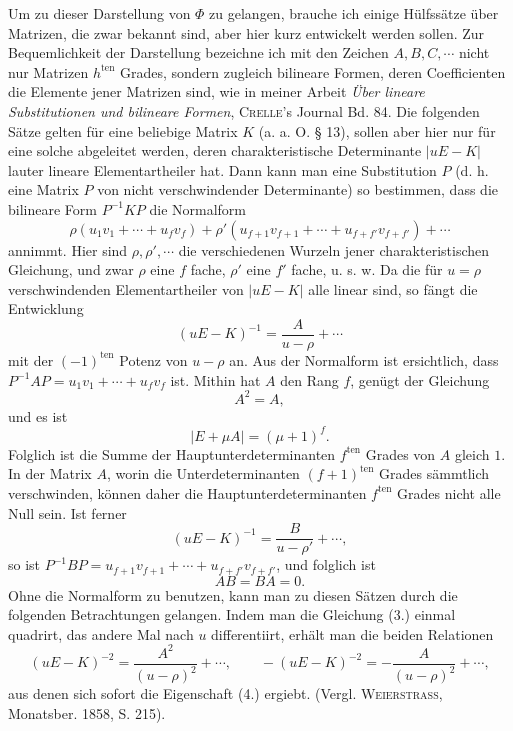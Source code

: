 \documentclass[11pt]{article}
\newcommand{\ten}{\mathrm{ten}}
\begin{document}
Um zu dieser Darstellung von $\Phi$ zu gelangen, brauche ich einige Hülfssätze über Matrizen, die zwar bekannt sind, aber hier kurz entwickelt werden sollen. Zur Bequemlichkeit der Darstellung bezeichne ich mit den Zeichen $A,B,C,\cdots$ nicht nur Matrizen $h^{\ten}$ Grades, sondern zugleich bilineare Formen, deren Coefficienten die Elemente jener Matrizen sind, wie in meiner Arbeit \emph{Über lineare Substitutionen und bilineare Formen}, \textsc{Crelle}'s Journal Bd. 84. Die folgenden Sätze gelten für eine beliebige Matrix $K$ (a. a. O. § 13), sollen aber hier nur für eine solche abgeleitet werden, deren charakteristische Determinante $|uE-K|$ lauter lineare Elementartheiler hat. Dann kann man eine Substitution $P$ (d. h. eine Matrix $P$ von nicht verschwindender Determinante) so bestimmen, dass die bilineare Form $P^{-1}KP$ die Normalform
\[
\rho(u_1v_1+\cdots+u_fv_f)+\rho'(u_{f+1}v_{f+1}+\cdots+u_{f+f'}v_{f+f'})+\cdots
\]
annimmt. Hier sind $\rho,\rho',\cdots$ die verschiedenen Wurzeln jener charakteristischen Gleichung, und zwar $\rho$ eine $f$ fache, $\rho'$ eine $f'$ fache, u. s. w. Da die für $u=\rho$ verschwindenden Elementartheiler von $|uE-K|$ alle linear sind, so fängt die Entwicklung
\begin{equation}\tag{3.}
(uE-K)^{-1}=\frac{A}{u-\rho}+\cdots
\end{equation}
mit der $(-1)^{\ten}$ Potenz von $u-\rho$ an. Aus der Normalform ist ersichtlich, dass $P^{-1}AP=u_1v_1+\cdots+u_fv_f$ ist. Mithin hat $A$ den Rang $f$, genügt der Gleichung
\begin{equation}\tag{4.}
A^2=A,
\end{equation}
und es ist
\begin{equation}\tag{5.}
|E+\mu A|=(\mu+1)^f.
\end{equation}
Folglich ist die Summe der Hauptunterdeterminanten $f^{\ten}$ Grades von $A$ gleich $1$. In der Matrix $A$, worin die Unterdeterminanten $(f+1)^{\ten}$ Grades sämmtlich verschwinden, können daher die Hauptunterdeterminanten $f^{\ten}$ Grades nicht alle Null sein. Ist ferner
\[
(uE-K)^{-1}=\frac{B}{u-\rho'}+\cdots,
\]
so ist $P^{-1}BP=u_{f+1}v_{f+1}+\cdots+u_{f+f'}v_{f+f'}$, und folglich ist
\begin{equation}\tag{6.}
AB=BA=0.
\end{equation}
Ohne die Normalform zu benutzen, kann man zu diesen Sätzen durch die folgenden Betrachtungen gelangen. Indem man die Gleichung (3.) einmal quadrirt, das andere Mal nach $u$ differentiirt, erhält man die beiden Relationen
\[
(uE-K)^{-2}=\frac{A^2}{(u-\rho)^2}+\cdots,
\qquad
-(uE-K)^{-2}=-\frac{A}{(u-\rho)^2}+\cdots,
\]
aus denen sich sofort die Eigenschaft (4.) ergiebt. (Vergl. \textsc{Weierstrass}, Monatsber. 1858, S. 215).
\end{document}
